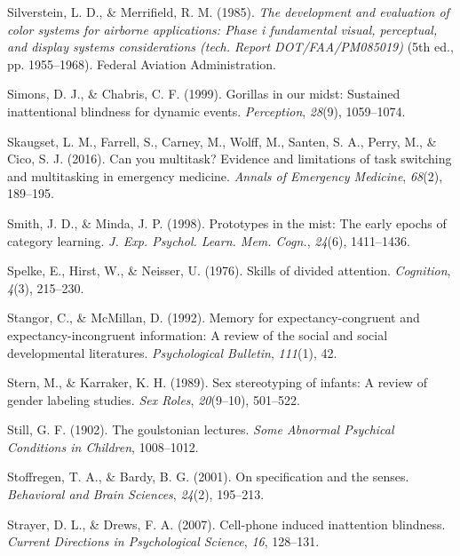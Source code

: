 \documentclass[
]{krantz}
\newlength{\cslhangindent}
\newlength{\cslentryspacingunit} %
\newenvironment{CSLReferences}[2] %
 {%
  \setlength{\parindent}{0pt}
  \ifodd #1
  \let\oldpar\par
  \def\par{\hangindent=\cslhangindent\oldpar}
  \fi
  \setlength{\parskip}{#2\cslentryspacingunit}
 }%
 {}
\begin{document}
\begin{CSLReferences}{1}{0}
\leavevmode{}%
Silverstein, L. D., \& Merrifield, R. M. (1985). \emph{The development and evaluation of color systems for airborne applications: Phase i fundamental visual, perceptual, and display systems considerations (tech. Report DOT/FAA/PM085019)} (5th ed., pp. 1955--1968). Federal Aviation Administration.

\leavevmode{}%
Simons, D. J., \& Chabris, C. F. (1999). Gorillas in our midst: Sustained inattentional blindness for dynamic events. \emph{Perception}, \emph{28}(9), 1059--1074.

\leavevmode{}%
Skaugset, L. M., Farrell, S., Carney, M., Wolff, M., Santen, S. A., Perry, M., \& Cico, S. J. (2016). Can you multitask? Evidence and limitations of task switching and multitasking in emergency medicine. \emph{Annals of Emergency Medicine}, \emph{68}(2), 189--195.

\leavevmode{}%
Smith, J. D., \& Minda, J. P. (1998). Prototypes in the mist: The early epochs of category learning. \emph{J. Exp. Psychol. Learn. Mem. Cogn.}, \emph{24}(6), 1411--1436.

\leavevmode{}%
Spelke, E., Hirst, W., \& Neisser, U. (1976). Skills of divided attention. \emph{Cognition}, \emph{4}(3), 215--230.

\leavevmode{}%
Stangor, C., \& McMillan, D. (1992). Memory for expectancy-congruent and expectancy-incongruent information: A review of the social and social developmental literatures. \emph{Psychological Bulletin}, \emph{111}(1), 42.

\leavevmode{}%
Stern, M., \& Karraker, K. H. (1989). Sex stereotyping of infants: A review of gender labeling studies. \emph{Sex Roles}, \emph{20}(9--10), 501--522.

\leavevmode{}%
Still, G. F. (1902). The goulstonian lectures. \emph{Some Abnormal Psychical Conditions in Children}, 1008--1012.

\leavevmode{}%
Stoffregen, T. A., \& Bardy, B. G. (2001). On specification and the senses. \emph{Behavioral and Brain Sciences}, \emph{24}(2), 195--213.

\leavevmode{}%
Strayer, D. L., \& Drews, F. A. (2007). Cell-phone induced inattention blindness. \emph{Current Directions in Psychological Science}, \emph{16}, 128--131.


\end{CSLReferences}
\end{document}
